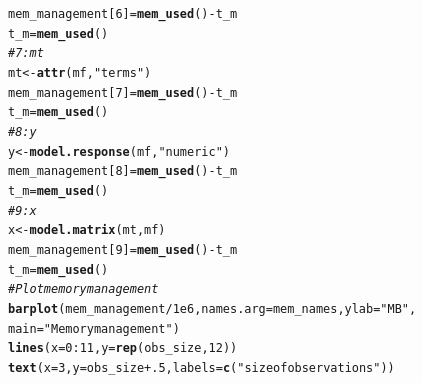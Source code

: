 \documentclass{llncs}\usepackage[]{graphicx}\usepackage[]{color}
\makeatletter
\newcommand{\hlnum}[1]{\textcolor[rgb]{0.686,0.059,0.569}{#1}}%
\newcommand{\hlstr}[1]{\textcolor[rgb]{0.192,0.494,0.8}{#1}}%
\newcommand{\hlcom}[1]{\textcolor[rgb]{0.678,0.584,0.686}{\textit{#1}}}%
\newcommand{\hlopt}[1]{\textcolor[rgb]{0,0,0}{#1}}%
\newcommand{\hlstd}[1]{\textcolor[rgb]{0.345,0.345,0.345}{#1}}%
\newcommand{\hlkwb}[1]{\textcolor[rgb]{0.69,0.353,0.396}{#1}}%
\newcommand{\hlkwc}[1]{\textcolor[rgb]{0.333,0.667,0.333}{#1}}%
\newcommand{\hlkwd}[1]{\textcolor[rgb]{0.737,0.353,0.396}{\textbf{#1}}}%
\newenvironment{kframe}{%
 \def\at@end@of@kframe{}%
 \ifinner\ifhmode%
  \def\at@end@of@kframe{\end{minipage}}%
  \begin{minipage}{\columnwidth}%
 \fi\fi%
 \def\FrameCommand##1{\hskip\@totalleftmargin \hskip-\fboxsep
 \colorbox{shadecolor}{##1}\hskip-\fboxsep
     \hskip-\linewidth \hskip-\@totalleftmargin \hskip\columnwidth}%
 \MakeFramed {\advance\hsize-\width
   \@totalleftmargin\z@ \linewidth\hsize
   \@setminipage}}%
 {\par\unskip\endMakeFramed%
 \at@end@of@kframe}
\newenvironment{knitrout}{}{} %
\makeatother
\begin{document}
\begin{knitrout}
\begin{kframe}
\begin{alltt}
  \hlstd{mem_management[}\hlnum{6}\hlstd{]}\hlkwb{=}\hlkwd{mem_used}\hlstd{()}\hlopt{-}\hlstd{t_m}
  \hlstd{t_m}\hlkwb{=}\hlkwd{mem_used}\hlstd{()}
  \hlcom{# 7 : mt}
  \hlstd{mt} \hlkwb{<-} \hlkwd{attr}\hlstd{(mf,} \hlstr{"terms"}\hlstd{)}
  \hlstd{mem_management[}\hlnum{7}\hlstd{]}\hlkwb{=}\hlkwd{mem_used}\hlstd{()}\hlopt{-}\hlstd{t_m}
  \hlstd{t_m}\hlkwb{=}\hlkwd{mem_used}\hlstd{()}
  \hlcom{# 8 : y}
  \hlstd{y} \hlkwb{<-} \hlkwd{model.response}\hlstd{(mf,} \hlstr{"numeric"}\hlstd{)}
  \hlstd{mem_management[}\hlnum{8}\hlstd{]}\hlkwb{=}\hlkwd{mem_used}\hlstd{()}\hlopt{-}\hlstd{t_m}
  \hlstd{t_m}\hlkwb{=}\hlkwd{mem_used}\hlstd{()}
  \hlcom{# 9 : x}
  \hlstd{x} \hlkwb{<-} \hlkwd{model.matrix}\hlstd{(mt, mf)}
  \hlstd{mem_management[}\hlnum{9}\hlstd{]}\hlkwb{=}\hlkwd{mem_used}\hlstd{()}\hlopt{-}\hlstd{t_m}
  \hlstd{t_m}\hlkwb{=}\hlkwd{mem_used}\hlstd{()}
  \hlcom{# Plot memory management}
  \hlkwd{barplot}\hlstd{(mem_management}\hlopt{/}\hlnum{1e6}\hlstd{,}\hlkwc{names.arg} \hlstd{= mem_names,}\hlkwc{ylab}\hlstd{=}\hlstr{"MB"}\hlstd{,}
          \hlkwc{main}\hlstd{=}\hlstr{"Memory management"}\hlstd{)}
  \hlkwd{lines}\hlstd{(}\hlkwc{x}\hlstd{=}\hlnum{0}\hlopt{:}\hlnum{11}\hlstd{,}\hlkwc{y}\hlstd{=}\hlkwd{rep}\hlstd{(obs_size,}\hlnum{12}\hlstd{))}
  \hlkwd{text}\hlstd{(}\hlkwc{x}\hlstd{=}\hlnum{3}\hlstd{,}\hlkwc{y}\hlstd{=obs_size}\hlopt{+}\hlnum{.5} \hlstd{,}\hlkwc{labels} \hlstd{=} \hlkwd{c}\hlstd{(}\hlstr{"size of observations"}\hlstd{))}


\end{alltt}
\end{kframe}
\end{knitrout}
\end{document}
